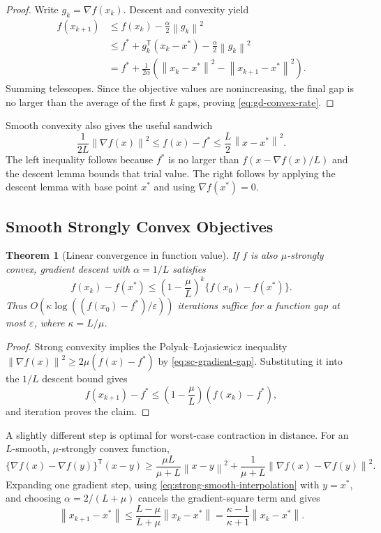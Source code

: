 \documentclass[12pt,oneside]{book}
\numberwithin{equation}{section}
\theoremstyle{definition}
\theoremstyle{plain}
\newtheorem{theorem}{Theorem}[section]
\theoremstyle{remark}
\newcommand{\norm}[1]{\left\lVert #1 \right\rVert}
\newcommand{\grad}{\nabla}
\begin{document}
\begin{proof}
Write $g_k=\grad f(x_k)$. Descent and convexity yield
\begin{align*}
 f(x_{k+1})
 &\leq f(x_k)-\frac\alpha2\norm{g_k}^2\\
 &\leq f^*+g_k^\mathsf T(x_k-x^*)-\frac\alpha2\norm{g_k}^2\\
 &=f^*+\frac1{2\alpha}
 \left(\norm{x_k-x^*}^2-\norm{x_{k+1}-x^*}^2\right).
\end{align*}
Summing telescopes. Since the objective values are nonincreasing, the final
gap is no larger than the average of the first $k$ gaps, proving
\cref{eq:gd-convex-rate}.
\end{proof}

Smooth convexity also gives the useful sandwich
\begin{equation}
 \frac1{2L}\norm{\grad f(x)}^2
 \leq f(x)-f^*
 \leq\frac L2\norm{x-x^*}^2.
 \label{eq:smooth-convex-sandwich}
\end{equation}
The left inequality follows because $f^*$ is no larger than
$f(x-\grad f(x)/L)$ and the descent lemma bounds that trial value. The right
follows by applying the descent lemma with base point $x^*$ and using
$\grad f(x^*)=0$.

\subsection{Smooth Strongly Convex Objectives}

\begin{theorem}[Linear convergence in function value]
If $f$ is also $\mu$-strongly convex, gradient descent with $\alpha=1/L$
satisfies
\[
 f(x_k)-f(x^*)\leq
 \left(1-\frac{\mu}{L}\right)^k\{f(x_0)-f(x^*)\}.
\]
Thus $O(\kappa\log((f(x_0)-f^*)/\varepsilon))$ iterations suffice for a
function gap at most $\varepsilon$, where $\kappa=L/\mu$.
\end{theorem}

\begin{proof}
Strong convexity implies the Polyak--\L{}ojasiewicz inequality
$\norm{\grad f(x)}^2\geq2\mu(f(x)-f^*)$ by
\cref{eq:sc-gradient-gap}. Substituting it into the $1/L$ descent bound gives
\[
 f(x_{k+1})-f^*
 \leq\left(1-\frac\mu L\right)(f(x_k)-f^*),
\]
and iteration proves the claim.
\end{proof}

A slightly different step is optimal for worst-case contraction in distance.
For an $L$-smooth, $\mu$-strongly convex function,
\begin{equation}
 \{\grad f(x)-\grad f(y)\}^\mathsf T(x-y)
 \geq\frac{\mu L}{\mu+L}\norm{x-y}^2
 +\frac1{\mu+L}\norm{\grad f(x)-\grad f(y)}^2.
 \label{eq:strong-smooth-interpolation}
\end{equation}
Expanding one gradient step, using \cref{eq:strong-smooth-interpolation} with
$y=x^*$, and choosing $\alpha=2/(L+\mu)$ cancels the gradient-square term and
gives
\begin{equation}
 \norm{x_{k+1}-x^*}
 \leq\frac{L-\mu}{L+\mu}\norm{x_k-x^*}
 =\frac{\kappa-1}{\kappa+1}\norm{x_k-x^*}.
 \label{eq:gd-optimal-distance-step}
\end{equation}
\end{document}
